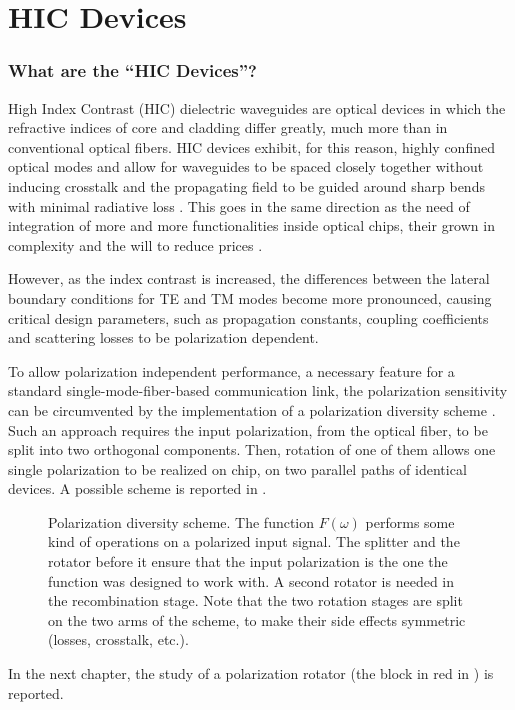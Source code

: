 \part{HIC Devices} \label{par:hic_devices} 

\section*{What are the ``HIC Devices''?}

High Index Contrast (HIC) dielectric waveguides are
optical devices in which the refractive indices of core and cladding
differ greatly, much more than in conventional optical fibers. HIC
devices exhibit, for this reason, highly confined optical modes and
allow for waveguides to be spaced closely together without inducing
crosstalk and the propagating field to be guided around sharp bends
with minimal radiative loss \cite{watts_integrated}. This goes in the
same direction as the need of integration of more and more
functionalities inside optical chips, their grown in complexity and
the will to reduce prices \cite{exp_pirelli}.

However, as the index contrast is increased, the differences between
the lateral boundary conditions for TE and TM modes become more
pronounced, causing critical design parameters, such as propagation
constants, coupling coefficients and scattering losses to be
polarization dependent.

To allow polarization independent performance, a necessary feature for
a standard single-mode-fiber-based communication link, the
polarization sensitivity can be circumvented by the implementation of
a polarization diversity scheme
\cite{madsen_optical}. Such an approach requires the input
polarization, from the optical fiber, to be split into two orthogonal
components. Then, rotation of one of them allows one single
polarization to be realized on chip, on two parallel paths of
identical devices. A possible scheme is reported in
.

\begin{figure}[htbp]
  \begin{center}
    \resizebox{12cm}{!}{}
  \end{center}
  \caption{Polarization diversity
    scheme. The function $F(\omega)$ performs some kind of operations
    on a polarized input signal. The splitter and the rotator before
    it ensure that the input polarization is the one the function was
    designed to work with. A second rotator is needed in the
    recombination stage. Note that the two rotation stages are split
    on the two arms of the scheme, to make their side effects symmetric
    (losses, crosstalk, etc.).}
  \label{fig:exp_fig1}
\end{figure}

In the next chapter, the study of a polarization rotator (the block in
red in ) is reported.



